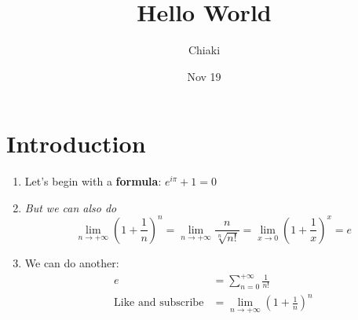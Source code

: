 \documentclass{article}
\title{Hello World}
\author{Chiaki}
\date{Nov 19}
\begin{document}
\maketitle
\section*{Introduction}
\begin{enumerate}
\item Let's begin with a \textbf{formula}: $e^{i\pi}+1=0$
\item \textit{But we can also do}
$$\lim_{n\to+\infty}\left(1+\frac{1}{n}\right)^n=\lim_{n\to+\infty}\frac{n}{\sqrt[n]{n!}}=\lim_{x\to 0}\left(1+\frac{1}{x}\right)^{x}=e$$
\item We can do another:
\begin{align}
e&=\sum_{n=0}^{+\infty}\frac{1}{n!}\\\text{Like and subscribe}&=\lim_{n\to+\infty}\left(1+\frac{1}{n}\right)^{n}
\end{align}
\end{enumerate}
\end{document}
